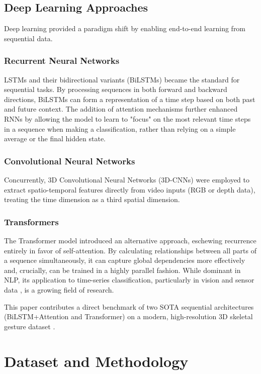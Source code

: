 \documentclass[]{IEEEphot}
\begin{document}
\subsection{Deep Learning Approaches}
Deep learning provided a paradigm shift by enabling end-to-end learning from sequential data.
\subsubsection{Recurrent Neural Networks}
LSTMs \cite{hochreiter1997} and their bidirectional variants (BiLSTMs) became the standard for sequential tasks. By processing sequences in both forward and backward directions, BiLSTMs can form a representation of a time step based on both past and future context. The addition of attention mechanisms \cite{bahdanau2014} further enhanced RNNs by allowing the model to learn to "focus" on the most relevant time steps in a sequence when making a classification, rather than relying on a simple average or the final hidden state.

\subsubsection{Convolutional Neural Networks}
Concurrently, 3D Convolutional Neural Networks (3D-CNNs) were employed to extract spatio-temporal features directly from video inputs (RGB or depth data), treating the time dimension as a third spatial dimension.

\subsubsection{Transformers}
The Transformer \cite{vaswani2017} model introduced an alternative approach, eschewing recurrence entirely in favor of self-attention. By calculating relationships between all parts of a sequence simultaneously, it can capture global dependencies more effectively and, crucially, can be trained in a highly parallel fashion. While dominant in NLP, its application to time-series classification, particularly in vision \cite{dosovitskiy2020} and sensor data \cite{transformer_timeseries_review}, is a growing field of research.

This paper contributes a direct benchmark of two SOTA sequential architectures (BiLSTM+Attention and Transformer) on a modern, high-resolution 3D skeletal gesture dataset \cite{dylem2024}.

\section{Dataset and Methodology}
\end{document}
